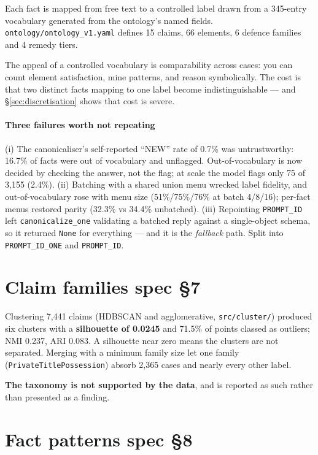 \documentclass[12pt,a4paper]{article}
\newcommand{\code}[1]{\texttt{\small #1}}
\newcommand{\spec}[1]{\textbf{spec §#1}}
\begin{document}
Each fact is mapped from free text to a controlled label drawn from a 345-entry vocabulary generated
from the ontology's named fields. \code{ontology/ontology\_v1.yaml} defines 15 claims, 66 elements, 6
defence families and 4 remedy tiers.

The appeal of a controlled vocabulary is comparability across cases: you can count element
satisfaction, mine patterns, and reason symbolically. The cost is that two distinct facts mapping to
one label become indistinguishable --- and §\ref{sec:discretisation} shows that cost is severe.

\paragraph{Three failures worth not repeating} (i) The canonicaliser's self-reported ``NEW'' rate of
0.7\% was untrustworthy: 16.7\% of facts were out of vocabulary and unflagged. Out-of-vocabulary is
now decided by checking the answer, not the flag; at scale the model flags only 75 of 3,155 (2.4\%).
(ii) Batching with a shared union menu wrecked label fidelity, and out-of-vocabulary rose with menu
size (51\%/75\%/76\% at batch 4/8/16); per-fact menus restored parity (32.3\% vs 34.4\% unbatched).
(iii) Repointing \code{PROMPT\_ID} left \code{canonicalize\_one} validating a batched reply against a
single-object schema, so it returned \code{None} for everything --- and it is the \emph{fallback}
path. Split into \code{PROMPT\_ID\_ONE} and \code{PROMPT\_ID}.

\section{Claim families \spec{7}}\label{sec:families}

Clustering 7,441 claims (HDBSCAN and agglomerative, \code{src/cluster/}) produced six clusters with
a \textbf{silhouette of 0.0245} and 71.5\% of points classed as outliers; NMI 0.237, ARI 0.083. A
silhouette near zero means the clusters are not separated. Merging with a minimum family size let one
family (\code{PrivateTitlePossession}) absorb 2,365 cases and nearly every other label.

\textbf{The taxonomy is not supported by the data}, and is reported as such rather than presented as
a finding.

\section{Fact patterns \spec{8}}\label{sec:patterns}
\end{document}
